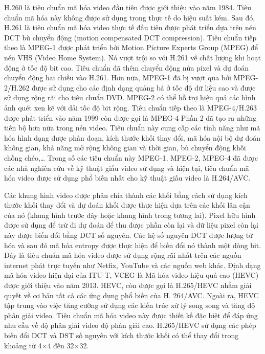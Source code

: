 H.260 là tiêu chuẩn mã hóa video đầu tiên được giới thiệu vào năm 1984. Tiêu chuẩn mã hóa này không được sử dụng trong thực tế do hiệu suất kém. Sau đó, H.261 là tiêu chuẩn mã hóa video thực tế đầu tiên được phát triển dựa trên nén DCT bù chuyển động (motion compensated DCT compression). Tiêu chuẩn tiếp theo là MPEG-1 được phát triển bởi Motion Picture Experts Group (MPEG) để nén VHS (Video Home System). Nó vượt trội so với H.261 về chất lượng khi hoạt động ở tốc độ bit cao. Tiêu chuẩn đã thêm chuyển động nửa pixel và dự đoán chuyển động hai chiều vào H.261. Hơn nữa, MPEG-1 đã bị vượt qua bởi MPEG-2/H.262 được sử dụng cho các định dạng quảng bá ở tốc độ dữ liệu cao và được sử dụng rộng rãi cho tiêu chuẩn DVD. MPEG-2 có thể hỗ trợ hiệu quả các hình ảnh quét xen kẽ với dải tốc độ bit rộng. Tiêu chuẩn tiếp theo là MPEG-4/H.263 được phát triển vào năm 1999 còn được gọi là MPEG-4 Phần 2 đã tạo ra những tiến bộ hơn nữa trong nén video. Tiêu chuẩn này cung cấp các tính năng như mã hóa hình dạng được phân đoạn, kích thước khối thay đổi, mã hóa nội bộ dự đoán không gian, khả năng mở rộng không gian và thời gian, bù chuyển động khối chồng chéo,… Trong số các tiêu chuẩn này MPEG-1, MPEG-2, MPEG-4 đã được các nhà nghiên cứu về kỹ thuật giấu video sử dụng và hiện tại, tiêu chuẩn mã hóa video được sử dụng phổ biến nhất cho kỹ thuật giấu video là H.264/AVC.

Các khung hình video được phân chia thành các khối bằng cách sử dụng kích thước khối thay đổi và dự đoán khối được thực hiện dựa trên các khối lân cận của nó (khung hình trước đây hoặc khung hình trong tương lai). Pixel hữu hình được sử dụng để trừ đi dự đoán để thu được phần còn lại và dữ liệu pixel còn lại này được biến đổi bằng DCT số nguyên. Các hệ số nguyên DCT được lượng tử hóa và sau đó mã hóa entropy được thực hiện để biến đổi nó thành một dòng bit. Đây là tiêu chuẩn mã hóa video được sử dụng rộng rãi nhất trên các nguồn internet phát trực tuyến như Netfix, YouTube và các nguồn web khác. Định dạng mã hóa video hiện đại của ITU-T, VCEG là Mã hóa video hiệu quả cao (HEVC) được giới thiệu vào năm 2013. HEVC, còn được gọi là H.265/HEVC nhằm giải quyết về cơ bản tất cả các ứng dụng phổ biến của H. 264/AVC. Ngoài ra, HEVC tập trung vào việc tăng cường sử dụng các kiến trúc xử lý song song và tăng độ phân giải video. Tiêu chuẩn mã hóa video này được thiết kế đặc biệt để đáp ứng nhu cầu về độ phân giải video độ phân giải cao. H.265/HEVC sử dụng các phép biến đổi DCT và DST số nguyên với kích thước khối có thể thay đổi trong khoảng từ 4×4 đến 32×32.

